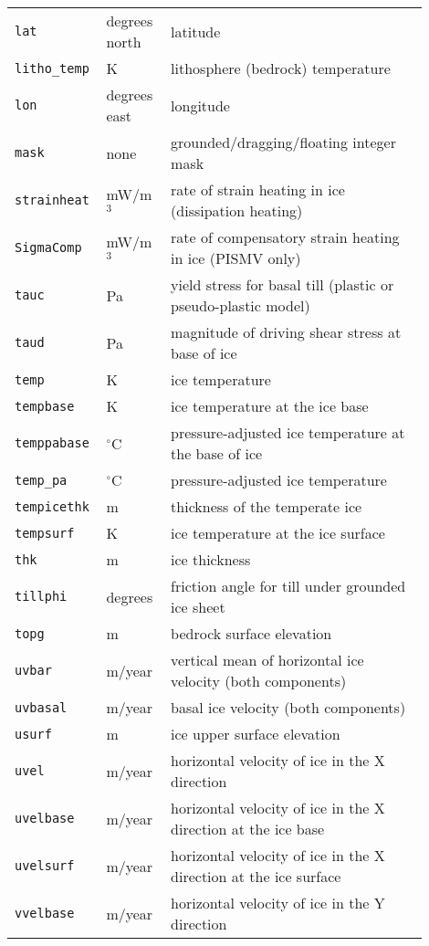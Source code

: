 \begin{center}
\begin{xtabular}{p{0.15\linewidth}p{0.15\linewidth}p{0.6\linewidth}}
    \texttt{lat} & degrees north& latitude \\
    \texttt{litho_temp} & K & lithosphere (bedrock) temperature\\
    \texttt{lon} & degrees east & longitude \\
    \texttt{mask} & none & grounded/dragging/floating integer mask \\
    \texttt{strainheat} & mW/m$^{3}$ & rate of strain heating in ice (dissipation heating) \\
    \texttt{SigmaComp} & mW/m$^{3}$ & rate of compensatory strain heating in ice (PISMV only)\\
    \texttt{tauc} & Pa & yield stress for basal till (plastic or pseudo-plastic model) \\
    \texttt{taud} & Pa & magnitude of driving shear stress at base of ice \\
    \texttt{temp} & K & ice temperature \\
    \texttt{tempbase} & K & ice temperature at the ice base\\
    \texttt{temppabase} & $^{\circ}$C & pressure-adjusted ice temperature at the base of ice\\
    \texttt{temp_pa} & $^{\circ}$C & pressure-adjusted ice temperature \\
    \texttt{tempicethk} & m & thickness of the temperate ice \\
    \texttt{tempsurf} & K & ice temperature at the ice surface\\
    \texttt{thk} & m & ice thickness\\
    \texttt{tillphi} & degrees & friction angle for till under grounded ice sheet \\
    \texttt{topg} & m & bedrock surface elevation \\
    \texttt{uvbar} & m/year & vertical mean of horizontal ice velocity (both components) \\
    \texttt{uvbasal} & m/year & basal ice velocity (both components)\\
    \texttt{usurf} & m & ice upper surface elevation \\
    \texttt{uvel} & m/year & horizontal velocity of ice in the X direction \\
    \texttt{uvelbase} & m/year & horizontal velocity of ice in the X direction
    at the ice base\\
    \texttt{uvelsurf} & m/year & horizontal velocity of ice in the X direction
    at the ice surface\\
   \texttt{vvelbase} & m/year & horizontal velocity of ice in the Y direction

\end{xtabular}
\end{center}
